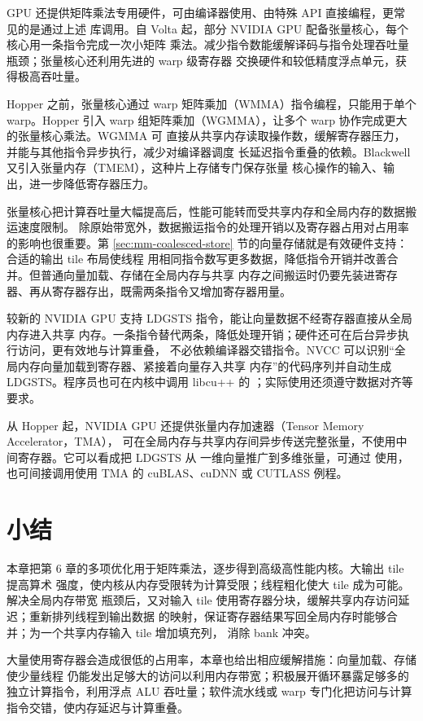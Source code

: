 GPU 还提供矩阵乘法专用硬件，可由编译器使用、由特殊 API 直接编程，更常见的是通过上述
库调用。自 Volta 起，部分 NVIDIA GPU 配备张量核心，每个核心用一条指令完成一次小矩阵
乘法。减少指令数能缓解译码与指令处理吞吐量瓶颈；张量核心还利用先进的 warp 级寄存器
交换硬件和较低精度浮点单元，获得极高吞吐量。

Hopper 之前，张量核心通过 warp 矩阵乘加（WMMA）指令编程，只能用于单个 warp。Hopper
引入 warp 组矩阵乘加（WGMMA），让多个 warp 协作完成更大的张量核心乘法。WGMMA 可
直接从共享内存读取操作数，缓解寄存器压力，并能与其他指令异步执行，减少对编译器调度
长延迟指令重叠的依赖。Blackwell 又引入张量内存（TMEM），这种片上存储专门保存张量
核心操作的输入、输出，进一步降低寄存器压力。

张量核心把计算吞吐量大幅提高后，性能可能转而受共享内存和全局内存的数据搬运速度限制。
除原始带宽外，数据搬运指令的处理开销以及寄存器占用对占用率的影响也很重要。第
\ref{sec:mm-coalesced-store} 节的向量存储就是有效硬件支持：合适的输出 tile 布局使线程
用相同指令数写更多数据，降低指令开销并改善合并。但普通向量加载、存储在全局内存与共享
内存之间搬运时仍要先装进寄存器、再从寄存器存出，既需两条指令又增加寄存器用量。

较新的 NVIDIA GPU 支持 LDGSTS 指令，能让向量数据不经寄存器直接从全局内存进入共享
内存。一条指令替代两条，降低处理开销；硬件还可在后台异步执行访问，更有效地与计算重叠，
不必依赖编译器交错指令。NVCC 可以识别“全局内存向量加载到寄存器、紧接着向量存入共享
内存”的代码序列并自动生成 LDGSTS。程序员也可在内核中调用 libcu++ 的
；实际使用还须遵守数据对齐等要求。

从 Hopper 起，NVIDIA GPU 还提供张量内存加速器（Tensor Memory Accelerator，TMA），
可在全局内存与共享内存间异步传送完整张量，不使用中间寄存器。它可以看成把 LDGSTS 从
一维向量推广到多维张量，可通过  使用，也可间接调用使用
TMA 的 cuBLAS、cuDNN 或 CUTLASS 例程。

\section{小结}
\label{sec:advanced-mm-summary}

本章把第 6 章的多项优化用于矩阵乘法，逐步得到高级高性能内核。大输出 tile 提高算术
强度，使内核从内存受限转为计算受限；线程粗化使大 tile 成为可能。解决全局内存带宽
瓶颈后，又对输入 tile 使用寄存器分块，缓解共享内存访问延迟；重新排列线程到输出数据
的映射，保证寄存器结果写回全局内存时能够合并；为一个共享内存输入 tile 增加填充列，
消除 bank 冲突。

大量使用寄存器会造成很低的占用率，本章也给出相应缓解措施：向量加载、存储使少量线程
仍能发出足够大的访问以利用内存带宽；积极展开循环暴露足够多的独立计算指令，利用浮点
ALU 吞吐量；软件流水线或 warp 专门化把访问与计算指令交错，使内存延迟与计算重叠。

